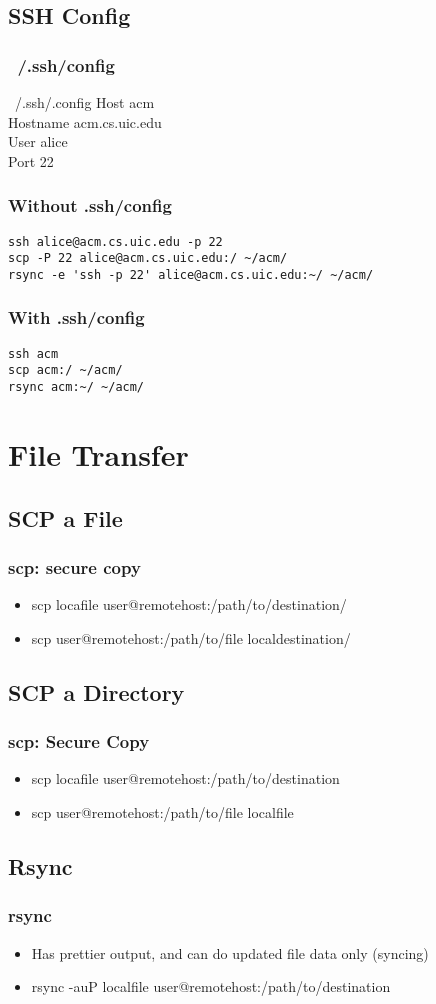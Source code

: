\documentclass[hyperref={pdfpagelabels=false}]{beamer}
\begin{document}
\subsection{SSH Config}
\frame
{
	\frametitle{~/.ssh/config}
	\begin{block}{~/.ssh/.config}
	Host acm\\
	Hostname acm.cs.uic.edu\\
	User alice\\
	Port 22
	\end{block}
}
\begin{frame}[fragile]
\frametitle{Without .ssh/config}
\begin{verbatim}
ssh alice@acm.cs.uic.edu -p 22
scp -P 22 alice@acm.cs.uic.edu:/ ~/acm/
rsync -e 'ssh -p 22' alice@acm.cs.uic.edu:~/ ~/acm/
\end{verbatim}
\end{frame}
\begin{frame}[fragile]
\frametitle{With .ssh/config}
\begin{verbatim}
ssh acm
scp acm:/ ~/acm/
rsync acm:~/ ~/acm/
\end{verbatim}
\end{frame}
\section{File Transfer}
\subsection{SCP a File}
\frame
{
    \frametitle{scp: secure copy}
    \begin{itemize}
    \item{scp locafile user@remotehost:/path/to/destination/}
    \item{scp user@remotehost:/path/to/file localdestination/}
    \end{itemize}
}
\subsection{SCP a Directory}
\frame
{
    \frametitle{scp: Secure Copy}
    \begin{itemize}
    \item{scp locafile user@remotehost:/path/to/destination}
    \item{scp user@remotehost:/path/to/file localfile}
    \end{itemize}
}
\subsection{Rsync}
\frame
{
    \frametitle{rsync}
    \begin{itemize}
    \item{Has prettier output, and can do updated file data only (syncing)}
    \item{rsync -auP localfile user@remotehost:/path/to/destination}
    \end{itemize}
}
\end{document}
